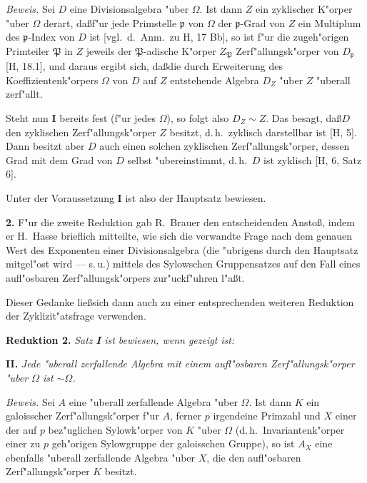 \documentclass[12pt,a4paper]{article}
\theoremstyle{plain}
\begin{document}
\noindent\textit{Beweis.}
Sei $D$ eine Divisionsalgebra "uber $\Omega$. Ist dann $Z$ ein zyklischer K"orper "uber $\Omega$ derart, da\ss f"ur jede Primstelle $\mathfrak{p}$ von $\Omega$ der $\mathfrak{p}$-Grad von $Z$ ein Multiplum des $\mathfrak{p}$-Index von $D$ ist [vgl.\ d.\ Anm.\ zu H, 17 Bb], so ist f"ur die zugeh"origen Primteiler $\mathfrak{P}$ in $Z$ jeweils der $\mathfrak{P}$-adische K"orper $Z_\mathfrak{P}$ Zerf"allungsk"orper von $D_\mathfrak{p}$ [H, 18.1], und daraus ergibt sich, da\ss die durch Erweiterung des Koeffizientenk"orpers $\Omega$ von $D$ auf $Z$ entstehende Algebra $D_Z$ "uber $Z$ "uberall zerf"allt.

Steht nun \textbf{I} bereits fest (f"ur jedes $\Omega$), so folgt also $D_Z \sim Z$. Das besagt, da\ss $D$ den zyklischen Zerf"allungsk"orper $Z$ besitzt, d.\,h.\ zyklisch darstellbar ist [H, 5]. Dann besitzt aber $D$ auch einen solchen zyklischen Zerf"allungsk"orper, dessen Grad mit dem Grad von $D$ selbst "ubereinstimmt, d.\,h.\ $D$ ist zyklisch [H, 6, Satz 6].

Unter der Voraussetzung \textbf{I} ist also der Hauptsatz bewiesen.

\medskip\noindent\textbf{2.}
F"ur die zweite Reduktion gab R.\ Brauer den entscheidenden Ansto\ss, indem er H.\ Hasse brieflich mitteilte, wie sich die verwandte Frage nach dem genauen Wert des Exponenten einer Divisionsalgebra (die "ubrigens durch den Hauptsatz mitgel"ost wird --- s.\,u.) mittels des Sylowschen Gruppensatzes auf den Fall eines aufl"osbaren Zerf"allungsk"orpers zur"uckf"uhren l"a\ss t.

Dieser Gedanke lie\ss sich dann auch zu einer entsprechenden weiteren Reduktion der Zyklizit"atsfrage verwenden.

\noindent\textbf{Reduktion 2.}
\textit{Satz \textbf{I} ist bewiesen, wenn gezeigt ist:}

\smallskip
\textbf{II.} \textit{Jede "uberall zerfallende Algebra mit einem aufl"osbaren Zerf"allungsk"orper "uber $\Omega$ ist $\sim \Omega$.}

\noindent\textit{Beweis.}
Sei $A$ eine "uberall zerfallende Algebra "uber $\Omega$. Ist dann $K$ ein galoisscher Zerf"allungsk"orper f"ur $A$, ferner $p$ irgendeine Primzahl und $X$ einer der auf $p$ bez"uglichen Sylowk"orper von $K$ "uber $\Omega$ (d.\,h.\ Invariantenk"orper einer zu $p$ geh"origen Sylowgruppe der galoisschen Gruppe), so ist $A_X$ eine ebenfalls "uberall zerfallende Algebra "uber $X$, die den aufl"osbaren Zerf"allungsk"orper $K$ besitzt.
\end{document}
